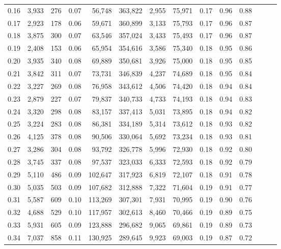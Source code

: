 \begin{tabular}{rrrrrrrrrrrrrr}
0.16 &  3,933 &    276 &  0.07 &   56,748 &  363,822 &   2,955 &  75,971 &  0.17 &  0.96 &      0.88 \\
0.17 &  2,923 &    178 &  0.06 &   59,671 &  360,899 &   3,133 &  75,793 &  0.17 &  0.96 &      0.87 \\
0.18 &  3,875 &    300 &  0.07 &   63,546 &  357,024 &   3,433 &  75,493 &  0.17 &  0.96 &      0.87 \\
0.19 &  2,408 &    153 &  0.06 &   65,954 &  354,616 &   3,586 &  75,340 &  0.18 &  0.95 &      0.86 \\
0.20 &  3,935 &    340 &  0.08 &   69,889 &  350,681 &   3,926 &  75,000 &  0.18 &  0.95 &      0.85 \\
0.21 &  3,842 &    311 &  0.07 &   73,731 &  346,839 &   4,237 &  74,689 &  0.18 &  0.95 &      0.84 \\
0.22 &  3,227 &    269 &  0.08 &   76,958 &  343,612 &   4,506 &  74,420 &  0.18 &  0.94 &      0.84 \\
0.23 &  2,879 &    227 &  0.07 &   79,837 &  340,733 &   4,733 &  74,193 &  0.18 &  0.94 &      0.83 \\
0.24 &  3,320 &    298 &  0.08 &   83,157 &  337,413 &   5,031 &  73,895 &  0.18 &  0.94 &      0.82 \\
0.25 &  3,224 &    283 &  0.08 &   86,381 &  334,189 &   5,314 &  73,612 &  0.18 &  0.93 &      0.82 \\
0.26 &  4,125 &    378 &  0.08 &   90,506 &  330,064 &   5,692 &  73,234 &  0.18 &  0.93 &      0.81 \\
0.27 &  3,286 &    304 &  0.08 &   93,792 &  326,778 &   5,996 &  72,930 &  0.18 &  0.92 &      0.80 \\
0.28 &  3,745 &    337 &  0.08 &   97,537 &  323,033 &   6,333 &  72,593 &  0.18 &  0.92 &      0.79 \\
0.29 &  5,110 &    486 &  0.09 &  102,647 &  317,923 &   6,819 &  72,107 &  0.18 &  0.91 &      0.78 \\
0.30 &  5,035 &    503 &  0.09 &  107,682 &  312,888 &   7,322 &  71,604 &  0.19 &  0.91 &      0.77 \\
0.31 &  5,587 &    609 &  0.10 &  113,269 &  307,301 &   7,931 &  70,995 &  0.19 &  0.90 &      0.76 \\
0.32 &  4,688 &    529 &  0.10 &  117,957 &  302,613 &   8,460 &  70,466 &  0.19 &  0.89 &      0.75 \\
0.33 &  5,931 &    605 &  0.09 &  123,888 &  296,682 &   9,065 &  69,861 &  0.19 &  0.89 &      0.73 \\
0.34 &  7,037 &    858 &  0.11 &  130,925 &  289,645 &   9,923 &  69,003 &  0.19 &  0.87 &      0.72 \\

\end{tabular}
